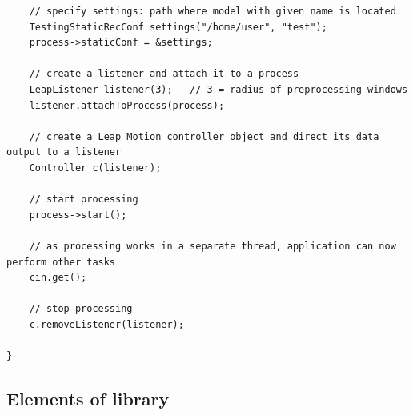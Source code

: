 \begin{lstlisting}
	// specify settings: path where model with given name is located
	TestingStaticRecConf settings("/home/user", "test");
	process->staticConf = &settings;
	
	// create a listener and attach it to a process
	LeapListener listener(3);	// 3 = radius of preprocessing windows
	listener.attachToProcess(process);
	
	// create a Leap Motion controller object and direct its data output to a listener
	Controller c(listener);

	// start processing
	process->start();
	
	// as processing works in a separate thread, application can now perform other tasks
	cin.get();
	
	// stop processing
	c.removeListener(listener);

}
\end{lstlisting}

\subsection{Elements of library}

